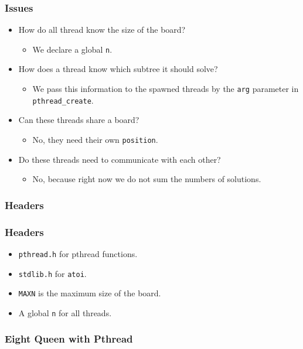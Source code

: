 \documentclass{beamer}
\begin{document}
\begin{frame}
\frametitle{Issues}
\begin{itemize}
\item How do all thread know the size of the board?
  \begin{itemize}
  \item We declare a global {\tt n}.
  \end{itemize}
\item How does a thread know which subtree it should solve?
  \begin{itemize}
  \item We pass this information to the spawned threads by the {\tt arg}
    parameter in {\tt pthread\_create}.
  \end{itemize}
\item Can these threads share a board?
  \begin{itemize}
  \item No, they need their own {\tt position}.
  \end{itemize}
\item Do these threads need to communicate with each other?
  \begin{itemize}
  \item No, because right now we do not sum the numbers of solutions.
  \end{itemize}
\end{itemize}
\end{frame}


\begin{frame}
\frametitle{Headers}
\end{frame}

\begin{frame}
\frametitle{Headers} 
\begin{itemize}
\item {\tt pthread.h} for pthread functions.
\item {\tt stdlib.h} for {\tt atoi}.
\item {\tt MAXN} is the maximum size of the board.
\item A global {\tt n} for all threads.
\end{itemize}
\end{frame}

\begin{frame}
\frametitle{Eight Queen with Pthread}
\end{frame}
\end{document}
